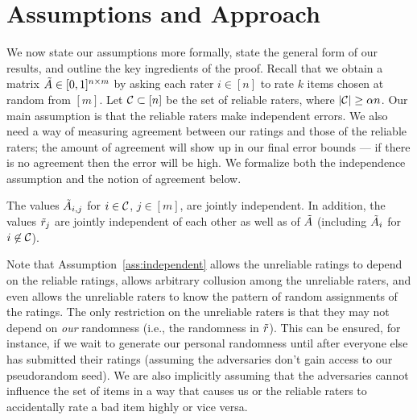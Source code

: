 \section{Assumptions and Approach}
\label{sec:assumptions}
\label{sec:approach}

We now state our assumptions more formally, state the general form 
of our results, and outline the key ingredients of the proof.
Recall that we obtain a matrix $\tilde{A} \in [0,1]^{n \times m}$ by asking each 
rater $i \in [n]$ to rate $k$ items chosen at random from $[m]$.
Let $\mathcal{C} \subset [n]$ be the set of reliable raters, where $|\mathcal{C}| \geq \alpha n$.
Our main assumption is that the reliable raters make independent errors. We also 
need a way of measuring agreement between our ratings and those of the reliable 
raters; the amount of agreement will show up in our final error bounds --- if 
there is no agreement then the error will be high. We formalize both the 
independence assumption and the notion of agreement below.

\begin{assumption}[Independence]
\label{ass:independent}
The values $\tilde{A}_{i,j}$ for $i \in \mathcal{C}$, $j \in [m]$, are 
jointly independent.
In addition, the values $\tilde{r}_j$ are jointly independent 
of each other as well as of $\tilde{A}$ (including $\tilde{A}_i$ for $i \not \in \mathcal{C}$).
\end{assumption}
Note that Assumption~\ref{ass:independent} allows the unreliable ratings to 
depend on the reliable ratings, allows arbitrary collusion among the unreliable 
raters, and even allows the unreliable raters to know the pattern of random 
assignments of the ratings. The only restriction on the unreliable raters is 
that they may not depend on \emph{our} randomness (i.e., the randomness in 
$\tilde{r}$). This can be ensured, for instance, if we wait to generate our 
personal randomness until after everyone else has submitted their ratings 
(assuming the adversaries don't gain access to our pseudorandom seed). We are 
also implicitly assuming that the adversaries cannot influence the set of 
items in a way that causes us or the reliable raters to accidentally rate a bad 
item highly or vice versa.

